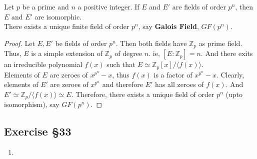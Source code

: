 \begin{theorem}
	Let $p$ be a prime and $n$ a positive integer. If $E$ and $E'$ are fields of order $p^n$, then $E$ and $E'$ are isomorphic.\\

	There exists a unique finite field of order $p^n$, say \textbf{Galois Field}, $GF(p^n)$.
\end{theorem}
\begin{proof}
	Let $E,E'$ be fields of order $p^n$. Then both fields have $\mathbb{Z}_p$ as prime field. Thus, $E$ is a simple extension of $\mathbb{Z}_p$ of degree $n$. ie, $[E:\mathbb{Z}_p] = n$. And there exits an irreducible polynomial $f(x)$ such that $E \simeq \mathbb{Z}_p[x]/\langle f(x) \rangle$. \\

	Elements of $E$ are zeroes of $x^{p^n}-x$, thus $f(x)$ is a factor of $x^{p^n}-x$. Clearly, elements of $E'$ are zeroes of $x^{p^n}$ and therefore $E'$ has all zeroes of $f(x)$. And $E' \simeq \mathbb{Z}_p/\langle f(x) \rangle \simeq E$. Therefore, there exists a unique field of order $p^n$ (upto isomorphism), say $GF(p^n)$.
\end{proof}

\subsection{Exercise \S33}
\begin{enumerate}
	\item
\end{enumerate}

